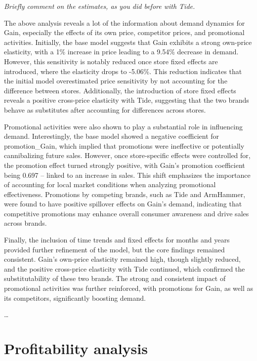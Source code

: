 \documentclass[
]{article}
\begin{document}
\emph{Briefly comment on the estimates, as you did before with Tide.}

The above analysis reveals a lot of the information about demand
dynamics for Gain, especially the effects of its own price, competitor
prices, and promotional activities. Initially, the base model suggests
that Gain exhibits a strong own-price elasticity, with a 1\% increase in
price leading to a 9.54\% decrease in demand. However, this sensitivity
is notably reduced once store fixed effects are introduced, where the
elasticity drops to -5.06\%. This reduction indicates that the initial
model overestimated price sensitivity by not accounting for the
difference between stores. Additionally, the introduction of store fixed
effects reveals a positive cross-price elasticity with Tide, suggesting
that the two brands behave as substitutes after accounting for
differences across stores.

Promotional activities were also shown to play a substantial role in
influencing demand. Interestingly, the base model showed a negative
coefficient for promotion\_Gain, which implied that promotions were
ineffective or potentially cannibalizing future sales. However, once
store-specific effects were controlled for, the promotion effect turned
strongly positive, with Gain's promotion coefficient being 0.697 --
linked to an increase in sales. This shift emphasizes the importance of
accounting for local market conditions when analyzing promotional
effectiveness. Promotions by competing brands, such as Tide and
ArmHammer, were found to have positive spillover effects on Gain's
demand, indicating that competitive promotions may enhance overall
consumer awareness and drive sales across brands.

Finally, the inclusion of time trends and fixed effects for months and
years provided further refinement of the model, but the core findings
remained consistent. Gain's own-price elasticity remained high, though
slightly reduced, and the positive cross-price elasticity with Tide
continued, which confirmed the substitutability of these two brands. The
strong and consistent impact of promotional activities was further
reinforced, with promotions for Gain, as well as its competitors,
significantly boosting demand.

\ldots{}

\newpage

\section{Profitability analysis}\label{profitability-analysis}
\end{document}
